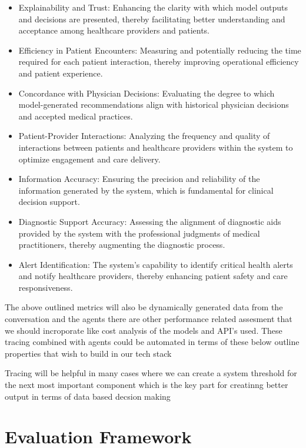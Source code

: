 \documentclass{article}
\begin{document}
\begin{itemize}
	\item Explainability and Trust: Enhancing the clarity with which model outputs and decisions are presented, thereby facilitating better understanding and acceptance among healthcare providers and patients.
	\item Efficiency in Patient Encounters: Measuring and potentially reducing the time required for each patient interaction, thereby improving operational efficiency and patient experience.
	\item Concordance with Physician Decisions: Evaluating the degree to which model-generated recommendations align with historical physician decisions and accepted medical practices.
	\item Patient-Provider Interactions: Analyzing the frequency and quality of interactions between patients and healthcare providers within the system to optimize engagement and care delivery.
	\item Information Accuracy: Ensuring the precision and reliability of the information generated by the system, which is fundamental for clinical decision support.
	\item Diagnostic Support Accuracy: Assessing the alignment of diagnostic aids provided by the system with the professional judgments of medical practitioners, thereby augmenting the diagnostic process.
	\item Alert Identification: The system's capability to identify critical health alerts and notify healthcare providers, thereby enhancing patient safety and care responsiveness.

\end{itemize} 

The above outlined metrics will also be dynamically generated data from the conversation and the agents there are other performance related assesment that we should incroporate like cost analysis of the models and API's used. These tracing combined with agents could be automated in terms of these below outline properties that wish to build in our tech stack 


Tracing will be helpful in many cases where we can create a system threshold for the next most important component which is the key part for creatinng better output in terms of data based decsion making

\section{Evaluation Framework}
\end{document}
